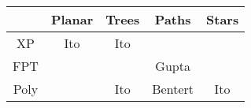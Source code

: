 
\renewcommand{\arraystretch}{1.5}
\begin{tabular}{|c||c|c|c|c|}
	\hline

	&
	Planar&
	Trees &
	Paths &
	Stars \\

	\hline
	\hline

	XP &
	\cellcolor{lightgray} Ito &
	\cellcolor{skyblue} Ito &
	\cellcolor{skyblue} &
	\cellcolor{skyblue} \\

	\hline

	FPT &
	\cellcolor{lightgray} &
	\only<2>{???} &
	\cellcolor{skyblue} Gupta &
	\cellcolor{skyblue} \\

	\hline

	Poly &
	\cellcolor{lightgray} &
	\cellcolor{lightgray} Ito &
	\cellcolor{lightgray} Bentert &
	\cellcolor{skyblue} Ito \\

	\hline
\end{tabular}
\renewcommand{\arraystretch}{1}
